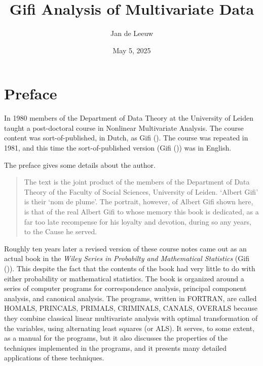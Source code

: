 \documentclass[
  12pt,
  letterpaper,
  DIV=11,
  numbers=noendperiod]{scrreprt}
\title{Gifi Analysis of Multivariate Data}
\author{Jan de Leeuw}
\date{May 5, 2025}
\renewcommand*\contentsname{Table of contents}
\newcommand\contentsname{Table of contents}
\begin{document}
\maketitle

\renewcommand*\contentsname{Table of contents}
{
\hypersetup{linkcolor=}
\setcounter{tocdepth}{2}
\tableofcontents
}


\chapter*{Preface}\label{preface}


In 1980 members of the Department of Data Theory at the University of
Leiden taught a post-doctoral course in Nonlinear Multivariate Analysis.
The course content was sort-of-published, in Dutch, as Gifi
(). The course was repeated in 1981, and
this time the sort-of-published version (Gifi
()) was in English.

The preface gives some details about the author.

\begin{quote}
The text is the joint product of the members of the Department of Data
Theory of the Faculty of Social Sciences, University of Leiden. `Albert
Gifi' is their `nom de plume'. The portrait, however, of Albert Gifi
shown here, is that of the real Albert Gifi to whose memory this book is
dedicated, as a far too late recompense for his loyalty and devotion,
during so any years, to the Cause he served.
\end{quote}

Roughly ten years later a revised version of these course notes came out
as an actual book in the \emph{Wiley Series in Probabilty and
Mathematical Statistics} (Gifi ()). This
despite the fact that the contents of the book had very little to do
with either probability or mathematical statistics. The book is
organized around a series of computer programs for correspondence
analysis, principal component analysis, and canonical analysis. The
programs, written in FORTRAN, are called HOMALS, PRINCALS, PRIMALS,
CRIMINALS, CANALS, OVERALS because they combine classical linear
multivariate analysis with optimal transformation of the variables,
using alternating least squares (or ALS). It serves, to some extent, as
a manual for the programs, but it also discusses the properties of the
techniques implemented in the programs, and it presents many detailed
applications of these techniques.
\end{document}
